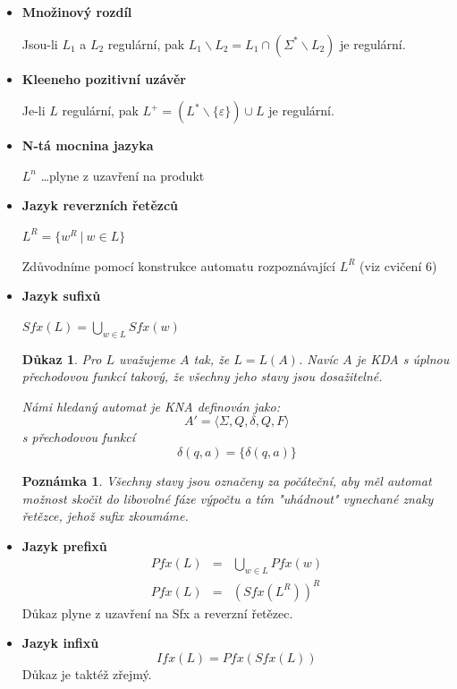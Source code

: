 \documentclass[10pt, a4paper, titlepage]{article}
\theoremstyle{note}
\newtheorem{dukaz}{Důkaz}
\newtheorem{poznamka}{Poznámka}
\begin{document}
\begin{itemize}

\item
\textbf{Množinový rozdíl}

Jsou-li $L_1$ a $L_2$ regulární, pak $L_1 \backslash L_2 = L_1 \cap (\Sigma^* \backslash L_2)$ je regulární.

\item
\textbf{Kleeneho pozitivní uzávěr}

Je-li $L$ regulární, pak $L^+ = (L^* \backslash \lbrace \varepsilon \rbrace) \cup L$ je regulární.

\item
\textbf{N-tá mocnina jazyka}

$L^n$ \ldots plyne z uzavření na produkt

\item
\textbf{Jazyk reverzních řetězců}

$L^R = \lbrace w^R \ |\ w \in L \rbrace$

Zdůvodníme pomocí konstrukce automatu rozpoznávající $L^R$ (viz cvičení 6) 

\item
\textbf{Jazyk sufixů}

$Sfx(L) = \bigcup_{w \in L} Sfx(w)$

\begin{dukaz}
Pro $L$ uvažujeme $A$ tak, že $L = L(A)$. Navíc $A$ je KDA s úplnou přechodovou funkcí takový, že všechny jeho stavy jsou dosažitelné.

Námi hledaný automat je KNA definován jako:
$$A' = \langle \Sigma,Q,\delta,Q,F \rangle$$
s přechodovou funkcí
$$\delta(q,a) = \lbrace \delta(q,a) \rbrace$$
\end{dukaz}
\begin{poznamka}
Všechny stavy jsou označeny za počáteční, aby měl automat možnost skočit do libovolné fáze výpočtu a tím "uhádnout" vynechané znaky řetězce, jehož sufix zkoumáme.
\end{poznamka}

\item
\textbf{Jazyk prefixů}
\begin{eqnarray*}
Pfx(L) &=& \bigcup_{w \in L} Pfx(w) \\
Pfx(L) &=& (Sfx(L^R))^R
\end{eqnarray*}
Důkaz plyne z uzavření na Sfx a reverzní řetězec.

\item
\textbf{Jazyk infixů}
$$
Ifx(L) = Pfx(Sfx(L))
$$
Důkaz je taktéž zřejmý.
\end{itemize}
\end{document}
